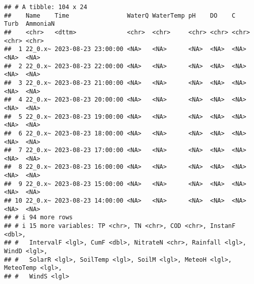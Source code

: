 \documentclass[
]{article}
\begin{document}
\begin{verbatim}
## # A tibble: 104 x 24
##    Name    Time                WaterQ WaterTemp pH    DO    C     Turb  AmmoniaN
##    <chr>   <dttm>              <chr>  <chr>     <chr> <chr> <chr> <chr> <chr>   
##  1 22_0.x~ 2023-08-23 23:00:00 <NA>   <NA>      <NA>  <NA>  <NA>  <NA>  <NA>    
##  2 22_0.x~ 2023-08-23 22:00:00 <NA>   <NA>      <NA>  <NA>  <NA>  <NA>  <NA>    
##  3 22_0.x~ 2023-08-23 21:00:00 <NA>   <NA>      <NA>  <NA>  <NA>  <NA>  <NA>    
##  4 22_0.x~ 2023-08-23 20:00:00 <NA>   <NA>      <NA>  <NA>  <NA>  <NA>  <NA>    
##  5 22_0.x~ 2023-08-23 19:00:00 <NA>   <NA>      <NA>  <NA>  <NA>  <NA>  <NA>    
##  6 22_0.x~ 2023-08-23 18:00:00 <NA>   <NA>      <NA>  <NA>  <NA>  <NA>  <NA>    
##  7 22_0.x~ 2023-08-23 17:00:00 <NA>   <NA>      <NA>  <NA>  <NA>  <NA>  <NA>    
##  8 22_0.x~ 2023-08-23 16:00:00 <NA>   <NA>      <NA>  <NA>  <NA>  <NA>  <NA>    
##  9 22_0.x~ 2023-08-23 15:00:00 <NA>   <NA>      <NA>  <NA>  <NA>  <NA>  <NA>    
## 10 22_0.x~ 2023-08-23 14:00:00 <NA>   <NA>      <NA>  <NA>  <NA>  <NA>  <NA>    
## # i 94 more rows
## # i 15 more variables: TP <chr>, TN <chr>, COD <chr>, InstanF <dbl>,
## #   IntervalF <lgl>, CumF <dbl>, NitrateN <chr>, Rainfall <lgl>, WindD <lgl>,
## #   SolarR <lgl>, SoilTemp <lgl>, SoilM <lgl>, MeteoH <lgl>, MeteoTemp <lgl>,
## #   WindS <lgl>
\end{verbatim}
\end{document}
